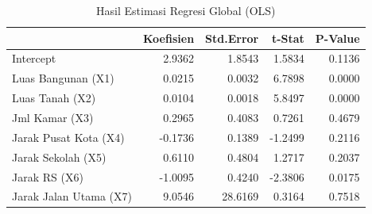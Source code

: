 \begin{table}[H]
\centering
\caption{Hasil Estimasi Regresi Global (OLS)}
\label{tab:ols_result}
\footnotesize
\begin{tabular}{lrrrr}
\toprule
 & Koefisien & Std.Error & t-Stat & P-Value \\
\midrule
Intercept & 2.9362 & 1.8543 & 1.5834 & 0.1136 \\
Luas Bangunan (X1) & 0.0215 & 0.0032 & 6.7898 & 0.0000 \\
Luas Tanah (X2) & 0.0104 & 0.0018 & 5.8497 & 0.0000 \\
Jml Kamar (X3) & 0.2965 & 0.4083 & 0.7261 & 0.4679 \\
Jarak Pusat Kota (X4) & -0.1736 & 0.1389 & -1.2499 & 0.2116 \\
Jarak Sekolah (X5) & 0.6110 & 0.4804 & 1.2717 & 0.2037 \\
Jarak RS (X6) & -1.0095 & 0.4240 & -2.3806 & 0.0175 \\
Jarak Jalan Utama (X7) & 9.0546 & 28.6169 & 0.3164 & 0.7518 \\
\bottomrule
\end{tabular}
\end{table}
